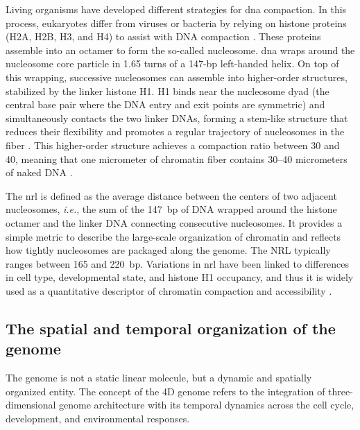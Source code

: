 \documentclass[11pt]{book}
\begin{document}
Living organisms have developed different strategies for \gls{dna} compaction. In this process, eukaryotes differ from viruses or bacteria by relying on histone proteins (H2A, H2B, H3, and H4) to assist with DNA compaction \cite{teif_condensed_2011}. These proteins assemble into an octamer to form the so-called nucleosome. \Gls{dna} wraps around the nucleosome core particle in 1.65 turns of a 147-bp left-handed helix. On top of this wrapping, successive nucleosomes can assemble into higher-order structures, stabilized by the linker histone H1. H1 binds near the nucleosome dyad (the central base pair where the DNA entry and exit points are symmetric) and simultaneously contacts the two linker DNAs, forming a stem-like structure that reduces their flexibility and promotes a regular trajectory of nucleosomes in the fiber \cite{bednar_structure_2017}. This higher-order structure achieves a compaction ratio between 30 and 40, meaning that one micrometer of chromatin fiber contains 30–40 micrometers of naked DNA \cite{luger_crystal_1997}.

The \gls{nrl} is defined as the average distance between the centers of two adjacent nucleosomes, \textit{i.e.}, the sum of the 147~bp of DNA wrapped around the histone octamer and the linker DNA connecting consecutive nucleosomes. It provides a simple metric to describe the large-scale organization of chromatin and reflects how tightly nucleosomes are packaged along the genome. The NRL typically ranges between 165 and 220~bp. Variations in \gls{nrl} have been linked to differences in cell type, developmental state, and histone H1 occupancy, and thus it is widely used as a quantitative descriptor of chromatin compaction and accessibility \cite{teif_genome-wide_2012,beshnova_regulation_2014,clarkson_ctcf-dependent_2019}.

\subsection{The spatial and temporal organization of the genome}
The genome is not a static linear molecule, but a dynamic and spatially organized entity. The concept of the 4D genome refers to the integration of three-dimensional genome architecture with its temporal dynamics across the cell cycle, development, and environmental responses.
\end{document}
